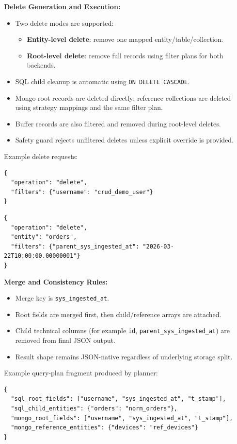 \documentclass[12pt,a4paper]{article}
\begin{document}
\textbf{Delete Generation and Execution:}
\begin{itemize}[leftmargin=*]
  \item Two delete modes are supported:
  \begin{itemize}[leftmargin=*]
    \item \textbf{Entity-level delete}: remove one mapped entity/table/collection.
    \item \textbf{Root-level delete}: remove full records using filter plans for both backends.
  \end{itemize}
  \item SQL child cleanup is automatic using \texttt{ON DELETE CASCADE}.
  \item Mongo root records are deleted directly; reference collections are deleted using strategy mappings and the same filter plan.
  \item Buffer records are also filtered and removed during root-level deletes.
  \item Safety guard rejects unfiltered deletes unless explicit override is provided.
\end{itemize}

Example delete requests:
\begin{lstlisting}[style=jsonstyle]
{
  "operation": "delete",
  "filters": {"username": "crud_demo_user"}
}
\end{lstlisting}

\begin{lstlisting}[style=jsonstyle]
{
  "operation": "delete",
  "entity": "orders",
  "filters": {"parent_sys_ingested_at": "2026-03-22T10:00:00.00000001"}
}
\end{lstlisting}

\textbf{Merge and Consistency Rules:}
\begin{itemize}[leftmargin=*]
  \item Merge key is \texttt{sys\_ingested\_at}.
  \item Root fields are merged first, then child/reference arrays are attached.
  \item Child technical columns (for example \texttt{id}, \texttt{parent\_sys\_ingested\_at}) are removed from final JSON output.
  \item Result shape remains JSON-native regardless of underlying storage split.
\end{itemize}

Example query-plan fragment produced by planner:
\begin{lstlisting}[style=jsonstyle]
{
  "sql_root_fields": ["username", "sys_ingested_at", "t_stamp"],
  "sql_child_entities": {"orders": "norm_orders"},
  "mongo_root_fields": ["username", "sys_ingested_at", "t_stamp"],
  "mongo_reference_entities": {"devices": "ref_devices"}
}
\end{lstlisting}
\end{document}
